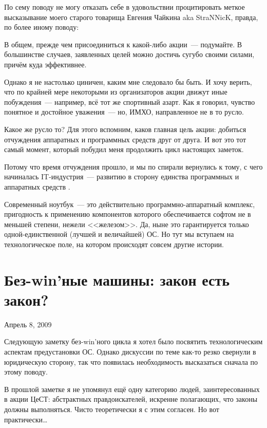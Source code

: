 По сему поводу не могу отказать себе в удовольствии процитировать меткое высказывание моего старого товарища Евгения Чайкина aka StraNNicK, правда, по более иному поводу:


\begin{shadequote}{}
В общем, прежде чем присоединиться к какой-либо акции~--- подумайте. В большинстве случаев, заявленных целей можно достичь сугубо своими силами, причём куда эффективнее.
\end{shadequote}

Однако я не настолько циничен, каким мне следовало бы быть. И хочу верить, что по крайней мере некоторыми из организаторов акции движут иные побуждения~--- например, всё тот же спортивный азарт. Как я говорил, чувство понятное и достойное уважения~--- но, ИМХО, направленное не в то русло.

Какое же русло то? Для этого вспомним, каков главная цель акции: добиться отчуждения аппаратных и программных средств друг от друга. И вот это тот самый момент, который побудил меня продолжить цикл настоящих заметок.

Потому что время отчуждения прошло, и мы по спирали вернулись к тому, с чего начиналась IT-индустрия~--- развитию в сторону единства программных и аппаратных средств .

Современный ноутбук~--- это действительно программно-аппаратный комплекс, пригодность к применению компонентов которого обеспечивается софтом не в меньшей степени, нежели <<железом>>. Да, ныне это гарантируется только одной-единственной (лучшей и величайшей) ОС. Но тут мы вступаем на технологическое поле, на котором происходят совсем другие истории.

\section{Без-win’ные машины: закон есть закон?} 

\begin{timeline}Апрель 8, 2009\end{timeline}

Следующую заметку без-win'ного цикла я хотел было посвятить технологическим аспектам предустановки ОС. Однако дискуссии по теме как-то резко свернули в юридическую сторону, так что появилась необходимость высказаться сначала по этому поводу.

В прошлой заметке я не упомянул ещё одну категорию людей, заинтересованных в акции ЦеСТ: абстрактных правдоискателей, искренне полагающих, что законы должны выполняться. Чисто теоретически я с этим согласен. Но вот практически\dots

